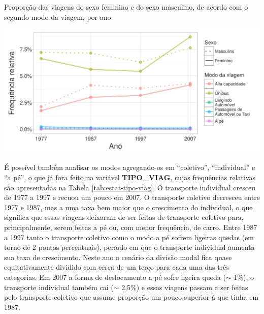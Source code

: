 \begin{grafico}[htb]%
    \caption{\label{graf:freq-modo2}Proporção das viagens do sexo feminino e do sexo masculino, de acordo com o segundo modo da viagem, por ano}%
    \begin{center}%
        \includegraphics[width=1\textwidth]{./imagens/freq-modo2.png}%
    \end{center}%
\end{grafico}%

É possível também analisar os modos agregando-os em ``coletivo'', ``individual'' e ``a pé'', o que já fora feito na variável \textbf{TIPO_VIAG}, cujas frequências relativas são apresentadas na Tabela \ref{tab:estat-tipo-viag}.
O transporte individual cresceu de 1977 a 1997 e recuou um pouco em 2007.
O transporte coletivo decresceu entre 1977 e 1987, mas a uma taxa bem maior que o crescimento do individual, o que significa que essas viagens deixaram de ser feitas de transporte coletivo para, principalmente, serem feitas a pé ou, com menor frequência, de carro.
Entre 1987 a 1997 tanto o transporte coletivo como o modo a pé sofrem ligeiras quedas (em torno de 2 pontos percentuais), período em que o transporte individual aumenta sua taxa de crescimento. Neste ano o cenário da divisão modal fica quase equitativamente dividido com cerca de um terço para cada uma das três categorias.
Em 2007 a forma de deslocamento a pé sofre ligeira queda ($\sim$ 1\%), o transporte individual também cai ($\sim$ 2,5\%) e essas viagens passam a ser feitas pelo transporte coletivo que assume proporção um pouco superior à que tinha em 1987.

